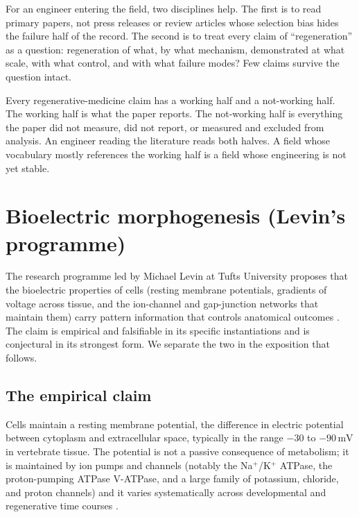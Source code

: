For an engineer entering the field, two disciplines help. The first is
to read primary papers, not press releases or review articles whose
selection bias hides the failure half of the record. The second is to
treat every claim of ``regeneration'' as a question: regeneration of
what, by what mechanism, demonstrated at what scale, with what control,
and with what failure modes? Few claims survive the question intact.

\begin{principle}
Every regenerative-medicine claim has a working half and a not-working
half. The working half is what the paper reports. The not-working half
is everything the paper did not measure, did not report, or measured
and excluded from analysis. An engineer reading the literature reads
both halves. A field whose vocabulary mostly references the working
half is a field whose engineering is not yet stable.
\end{principle}

\section{Bioelectric morphogenesis (Levin's programme)}

The research programme led by Michael Levin at Tufts University
proposes that the bioelectric properties of cells (resting membrane
potentials, gradients of voltage across tissue, and the ion-channel
and gap-junction networks that maintain them) carry pattern information
that controls anatomical outcomes
\cite{paper:v6c13-levin-bioelectric-2014,
paper:v6c13-pezzulo-levin-2015,
paper:v6c13-mathews-levin-2017,
paper:v6c13-levin-comp-boundary-2019,
paper:v6c13-levin-life-death-2021,
paper:v6c13-levin-darwin-agential-2023}.
The claim is empirical and falsifiable in its specific instantiations
and is conjectural in its strongest form. We separate the two in the
exposition that follows.

\subsection{The empirical claim}

Cells maintain a resting membrane potential, the difference in electric
potential between cytoplasm and extracellular space, typically in the
range $-30$ to $-90\,\text{mV}$ in vertebrate tissue. The potential is
not a passive consequence of metabolism; it is maintained by ion pumps
and channels (notably the Na$^+$/K$^+$ ATPase, the proton-pumping
ATPase V-ATPase, and a large family of potassium, chloride, and proton
channels) and it varies systematically across developmental and
regenerative time courses \cite{paper:v6c13-levin-bioelectric-2014}.


